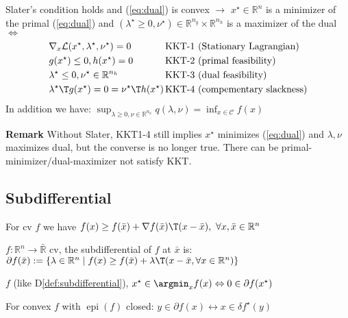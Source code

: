 \begin{theorem}
	Slater's condition holds
	and (\ref{eq:dual}) is convex
	$\rightarrow$
	$x^\star \in \mathbb{R}^{n}$ is a minimizer of the primal (\ref{eq:dual})
	and $(\lambda^\star \ge 0,\nu^\star) \in \mathbb{R}^{n_g}\times\mathbb{R}^{n_h}$ is a maximizer of the dual
	$\Leftrightarrow$
	$$\begin{aligned}
			              & \nabla_x\mathcal{L}(x^\star,\lambda^\star,\nu^\star)=0
			              & \text{KKT-1 }
			              & \text{(Stationary Lagrangian)}
			\\
			              & g(x^\star)\le0, h(x^\star)=0
			              & \text{KKT-2 }
			              & \text{(primal feasibility)}
			\\
			              & \lambda^\star\le0, \nu^\star \in \mathbb{R}^{n_h}
			              & \text{KKT-3 }
			              & \text{(dual feasibility)}
			\\
			              & {\lambda^\star}\T g(x^\star)=0={\nu^\star}\T h(x^\star)
			\hspace{-3mm} &
			\text{KKT-4 }
			              & \text{(compementary slackness)}
			\\
		\end{aligned}$$
	In addition we have:
	$\sup_{\lambda\ge0,\nu\in\mathbb{R}^{n_h}}q(\lambda,\nu)=\inf_{x\in\mathcal{C}}f(x)$
\end{theorem}

\textbf{Remark} Without Slater,
KKT1-4 still implies $x^\star$ minimizes (\ref{eq:dual})
and $\lambda,\nu$ maximizes dual,
but the converse is no longer true.
There can be primal-minimizer/dual-maximizer not satisfy KKT.

\subsection{Subdifferential}

For cv $f$ we have
$f(x)\ge f(\bar{x})+\nabla f(\bar{x})\T(x-\bar{x}),\ \forall x,\bar{x}\in \mathbb{R}^{n}$

\begin{definition}
	$f: \mathbb{R}^{n} \rightarrow \bar{\mathbb{R}}$ cv,
	the subdifferential of $f$ at $\bar{x}$ is:
	$\partial f(\bar{x}):=
		\{\lambda \in \mathbb{R}^{n} \mid
		f(x)\ge f(\bar{x})+\lambda\T(x-\bar{x},
		\forall x \in \mathbb{R}^{n})
		\}$
	\label{def:subdifferential}
\end{definition}


\begin{proposition}[]
	$f$ (like D\ref{def:subdifferential}),
	$x^\star\in\argmin_x f(x)
		\Leftrightarrow
		0 \in\partial f(x^\star)$
\end{proposition}

\begin{proposition}
	For convex $f$ with $\operatorname{epi}(f)$ closed:
	$y \in \partial f(x) \leftrightarrow x \in \delta f^\star(y)$
\end{proposition}

